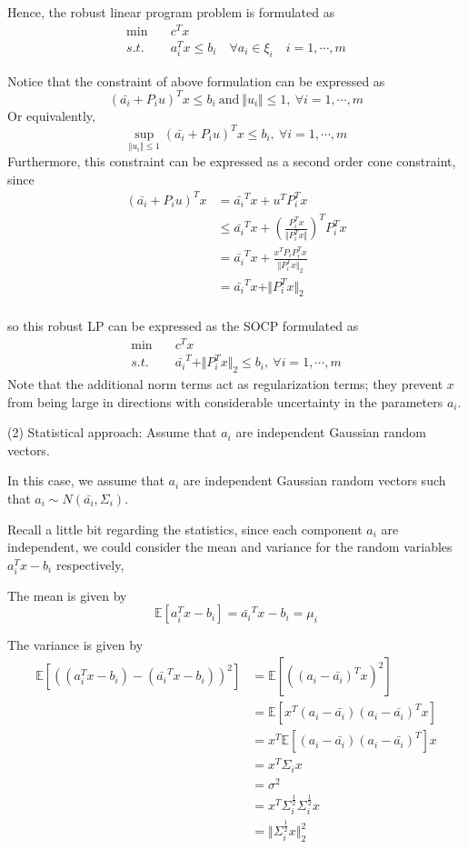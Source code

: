 Hence, the robust linear program problem is formulated as
\begin{align*}
\min\quad &c^Tx\\
s.t. \quad&a_i^Tx\leq b_i\quad \forall a_i \in \xi_i \quad i = 1,\cdots,m
\end{align*}

Notice that the constraint of above formulation can be expressed as
$$(\bar{a_i} + P_iu)^Tx\leq b_i\ \text{and}\ \Vert u_i\Vert \leq 1,\ \forall i = 1,\cdots,m$$
Or equivalently,
$$\sup_{\Vert u_i\Vert \leq 1}(\bar{a_i} + P_iu)^Tx\leq b_i,\ \forall i = 1,\cdots,m$$
Furthermore, this constraint can be expressed as a second order cone constraint, since
\begin{align*}
(\bar{a_i} + P_iu)^Tx &= \bar{a_i}^Tx + u^TP_i^Tx \\
&\leq \bar{a_i}^Tx + (\frac{P_i^Tx}{\Vert P_i^Tx\Vert})^TP_i^Tx\\
&= \bar{a_i}^Tx + \frac{x^TP_iP_i^Tx}{\Vert P_i^Tx\Vert_2}\\
&= \bar{a_i}^Tx + \Vert P_i^Tx\Vert_2
\end{align*}\\
so this robust LP can be expressed as the SOCP formulated as
\begin{align*}
\min\quad &c^Tx\\
s.t. \quad&\bar{a_i}^T + \Vert P_i^T x\Vert_2\leq b_i,\ \forall i = 1,\cdots,m
\end{align*}
Note that the additional norm terms act as regularization terms; they prevent $x$ from being large in directions with considerable uncertainty in the parameters $a_i$.


\vspace{0.3cm}
(2) Statistical approach: Assume that $a_i$ are independent Gaussian random vectors.

In this case, we assume that $a_i$ are independent Gaussian random vectors such that $a_i \sim N(\bar{a_i}, \Sigma_i)$.

Recall a little bit regarding the statistics, since each component $a_i$ are independent, we could consider the mean and variance for the random variables $a_i^Tx - b_i$ respectively,

The mean is given by
$$\mathbb{E}[a_i^Tx - b_i] = \bar{a_i}^Tx - b_i = \mu_i$$

The variance is given by
\begin{align*}
\mathbb{E}[((a_i^Tx - b_i) - (\bar{a_i}^Tx - b_i))^2] 
&= \mathbb{E}[((a_i - \bar{a_i})^Tx)^2]\\
&= \mathbb{E}[x^T(a_i - \bar{a_i})(a_i - \bar{a_i})^Tx] \\
&= x^T\mathbb{E}[(a_i - \bar{a_i})(a_i - \bar{a_i})^T]x\\
&= x^T\Sigma_i x \\
&= \sigma^2\\
&= x^T \Sigma_i^{\frac{1}{2}}\Sigma_i^{\frac{1}{2}} x\\
&= \Vert \Sigma_i^{\frac{1}{2}} x\Vert^2_2
\end{align*}

